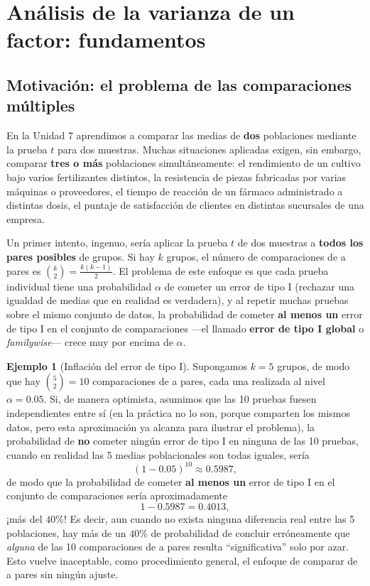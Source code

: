 \documentclass[11pt,a4paper]{article}
\theoremstyle{plain}
\theoremstyle{definition}
\newtheorem{ejemplo}[teorema]{Ejemplo}
\theoremstyle{remark}
\begin{document}
\newpage
\section{Análisis de la varianza de un factor: fundamentos}

\subsection{Motivación: el problema de las comparaciones múltiples}

En la Unidad 7 aprendimos a comparar las medias de \textbf{dos} poblaciones mediante la prueba $t$ para dos muestras. Muchas situaciones aplicadas exigen, sin embargo, comparar \textbf{tres o más} poblaciones simultáneamente: el rendimiento de un cultivo bajo varios fertilizantes distintos, la resistencia de piezas fabricadas por varias máquinas o proveedores, el tiempo de reacción de un fármaco administrado a distintas dosis, el puntaje de satisfacción de clientes en distintas sucursales de una empresa.

Un primer intento, ingenuo, sería aplicar la prueba $t$ de dos muestras a \textbf{todos los pares posibles} de grupos. Si hay $k$ grupos, el número de comparaciones de a pares es $\binom{k}{2}=\frac{k(k-1)}{2}$. El problema de este enfoque es que cada prueba individual tiene una probabilidad $\alpha$ de cometer un error de tipo I (rechazar una igualdad de medias que en realidad es verdadera), y al repetir muchas pruebas sobre el mismo conjunto de datos, la probabilidad de cometer \textbf{al menos un} error de tipo I en el conjunto de comparaciones —el llamado \textbf{error de tipo I global} o \emph{familywise}— crece muy por encima de $\alpha$.

\begin{ejemplo}[Inflación del error de tipo I]
Supongamos $k=5$ grupos, de modo que hay $\binom{5}{2}=10$ comparaciones de a pares, cada una realizada al nivel $\alpha=0.05$. Si, de manera optimista, asumimos que las 10 pruebas fuesen independientes entre sí (en la práctica no lo son, porque comparten los mismos datos, pero esta aproximación ya alcanza para ilustrar el problema), la probabilidad de \textbf{no} cometer ningún error de tipo I en ninguna de las 10 pruebas, cuando en realidad las 5 medias poblacionales son todas iguales, sería
\[
(1-0.05)^{10} \approx 0.5987,
\]
de modo que la probabilidad de cometer \textbf{al menos un} error de tipo I en el conjunto de comparaciones sería aproximadamente
\[
1-0.5987 = 0.4013,
\]
¡más del $40\%$! Es decir, aun cuando no exista ninguna diferencia real entre las 5 poblaciones, hay más de un $40\%$ de probabilidad de concluir erróneamente que \emph{alguna} de las 10 comparaciones de a pares resulta ``significativa'' solo por azar. Esto vuelve inaceptable, como procedimiento general, el enfoque de comparar de a pares sin ningún ajuste.
\end{ejemplo}
\end{document}

